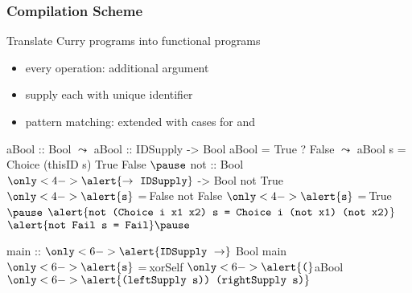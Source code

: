 \documentclass[10pt]{beamer}
\begin{document}
\begin{frame}[fragile]
\frametitle{Compilation Scheme}

\begin{block}{Translate Curry programs into functional programs}
\begin{itemize}
\item every operation: additional  argument
\item supply each  with unique identifier
\item pattern matching: extended with cases for  and 
\end{itemize}
\end{block}
\pause
\vfill

\begin{exampleblock}{}
\begin{curry}
aBool :: Bool         $\leadsto$   aBool :: IDSupply -> Bool
aBool = True ? False  $\leadsto$   aBool s =$~$Choice (thisID s) True False
$\pause$
not :: Bool $\only<4->{\alert{\to~\mbox{\tt{IDSupply}}}}$ -> Bool
not True  $\only<4->{\alert{\mbox{\tt{s}}}}$ =$~$False
not False $\only<4->{\alert{\mbox{\tt{s}}}}$ =$~$True$\pause$
$\alert{\mbox{\tt{not (Choice i x1 x2) s = Choice i (not x1) (not x2)}}}$
$\alert{\mbox{\tt{not Fail s = Fail}}}\pause$

main :: $\only<6->{\alert{\mbox{\tt{IDSupply}}~\to}}$ Bool
main $\only<6->{\alert{\mbox{\tt{s}}}}$ =$~$xorSelf $\only<6->{\alert{\mbox{\tt{(}}}}$aBool $\only<6->{\alert{\mbox{\tt{(leftSupply s)) (rightSupply s)}}}}$
\end{curry}
\end{exampleblock}
\end{frame}
\end{document}
